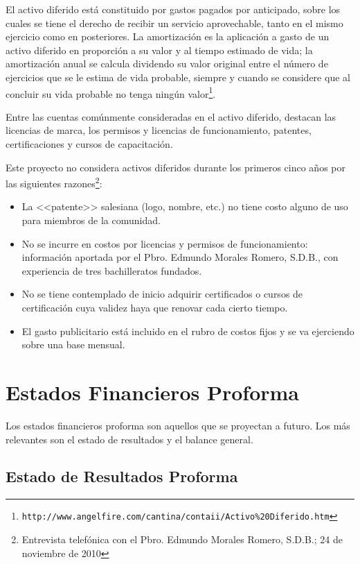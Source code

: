 El activo diferido está constituido por gastos pagados por anticipado, sobre los cuales se tiene el derecho de recibir un servicio aprovechable, tanto en el mismo ejercicio como en posteriores. La amortización es la aplicación a gasto de un activo diferido en proporción a su valor y al tiempo estimado de vida; la amortización anual se calcula dividendo su valor original entre el número de ejercicios que se le estima de vida probable, siempre y cuando se considere que al concluir su vida probable no tenga ningún valor\footnote{\texttt{http://www.angelfire.com/cantina/contaii/Activo\%20Diferido.htm}}.

Entre las cuentas comúnmente consideradas en el activo diferido, destacan las licencias de marca, los permisos y licencias de funcionamiento, patentes, certificaciones y cursos de capacitación.

Este proyecto no considera activos diferidos durante los primeros cinco años por las siguientes razones\footnote{Entrevista telefónica con el Pbro. Edmundo Morales Romero, S.D.B.; 24 de noviembre de 2010}:

\begin{itemize}
	\item La <<patente>> salesiana (logo, nombre, etc.) no tiene costo alguno de uso para miembros de la comunidad.
	\item No se incurre en costos por licencias y permisos de funcionamiento: información aportada por el Pbro. Edmundo Morales Romero, S.D.B., con experiencia de tres bachilleratos fundados.
	\item No se tiene contemplado de inicio adquirir certificados o cursos de certificación cuya validez haya que renovar cada cierto tiempo.
	\item El gasto publicitario está incluido en el rubro de costos fijos y se va ejerciendo sobre una base mensual.
\end{itemize}

\section{Estados Financieros Proforma}

Los estados financieros proforma son aquellos que se proyectan a futuro. Los más relevantes son el estado de resultados y el balance general.

\subsection{Estado de Resultados Proforma}

